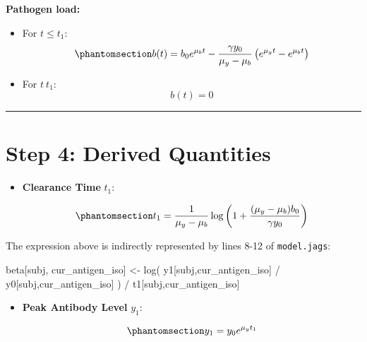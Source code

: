\documentclass[
]{article}
\newenvironment{Shaded}{\begin{snugshade}}{\end{snugshade}}
\newcommand{\FunctionTok}[1]{\textcolor[rgb]{0.28,0.35,0.67}{#1}}
\newcommand{\NormalTok}[1]{\textcolor[rgb]{0.00,0.23,0.31}{#1}}
\newcommand{\OtherTok}[1]{\textcolor[rgb]{0.00,0.23,0.31}{#1}}
\newcommand{\SpecialCharTok}[1]{\textcolor[rgb]{0.37,0.37,0.37}{#1}}
\providecommand{\tightlist}{%
  \setlength{\itemsep}{0pt}\setlength{\parskip}{0pt}}\usepackage{longtable,booktabs,array}
\begin{document}
\textbf{Pathogen load:}

\begin{itemize}
\tightlist
\item
  For \(t \leq t_1\): \begin{equation}\phantomsection\label{eq-6}{
  b(t) = b_0 e^{\mu_b t} - \frac{\gamma y_0}{\mu_y - \mu_b} \left( e^{\mu_y t} - e^{\mu_b t} \right)
  }\end{equation}
\item
  For \(t \> t_1\): \[
  b(t) = 0
  \]
\end{itemize}

\begin{center}\rule{0.5\linewidth}{0.5pt}\end{center}

\section{Step 4: Derived Quantities}\label{step-4-derived-quantities}

\begin{itemize}
\item
  \textbf{Clearance Time} \(t_1\):

  \begin{equation}\phantomsection\label{eq-7}{
  t_1 = \frac{1}{\mu_y - \mu_b} \log\left(1 + \frac{(\mu_y - \mu_b) b_0}{\gamma y_0}\right)
  }\end{equation}
\end{itemize}

The expression above is indirectly represented by lines 8-12 of
\texttt{model.jags}:

\begin{Shaded}
\begin{Highlighting}[numbers=left,,firstnumber=8,]
\NormalTok{     beta[subj, cur\_antigen\_iso] }\OtherTok{\textless{}{-}} 
       \FunctionTok{log}\NormalTok{(}
\NormalTok{         y1[subj,cur\_antigen\_iso] }\SpecialCharTok{/}\NormalTok{ y0[subj,cur\_antigen\_iso]}
\NormalTok{         ) }\SpecialCharTok{/} 
\NormalTok{       t1[subj,cur\_antigen\_iso]}
\end{Highlighting}
\end{Shaded}

\begin{itemize}
\item
  \textbf{Peak Antibody Level} \(y_1\):

  \begin{equation}\phantomsection\label{eq-8}{
  y_1 = y_0 e^{\mu_y t_1}
  }\end{equation}
\end{itemize}
\end{document}
